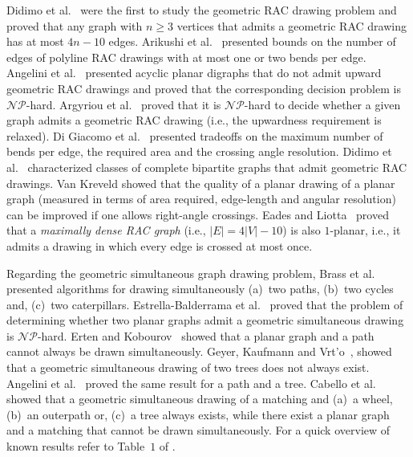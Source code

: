 \documentclass{llncs}
\newcommand{\NP}{\mathcal{NP}}
\begin{document}
Didimo et al.\ \cite{DEL09} were the first to study the geometric
RAC drawing problem and proved that any graph with $n\geq 3$
vertices that admits a geometric RAC drawing has at most $4n-10$
edges. Arikushi et al.\ \cite{AFKMT10} presented bounds on the
number of edges of polyline RAC drawings with at most one or two
bends per edge. Angelini et al.\ \cite{ACBDFKS09} presented acyclic
planar digraphs that do not admit upward geometric RAC drawings and
proved that the corresponding decision problem is $\NP$-hard.
Argyriou et al.\ \cite{ABS11} proved that it is $\NP$-hard to decide
whether a given graph admits a geometric RAC drawing (i.e., the
upwardness requirement is relaxed). Di Giacomo et al.\
\cite{DGDLM10} presented tradeoffs on the maximum number of bends
per edge, the required area and the crossing angle resolution.
Didimo et al.\ \cite{DEL10} characterized classes of complete
bipartite graphs that admit geometric RAC drawings. Van Kreveld
\cite{vK10} showed that the quality of a planar drawing of a planar
graph (measured in terms of area required, edge-length and angular
resolution) can be improved if one allows right-angle crossings.
Eades and Liotta\ \cite{EL11} proved that a \emph{maximally dense
RAC graph} (i.e., $|E|=4|V|-10$) is also $1$-planar, i.e., it admits
a drawing in which every edge is crossed at most once.

Regarding the geometric simultaneous graph drawing problem, Brass et
al.\ \cite{BCDE07} presented algorithms for drawing simultaneously
(a)~two paths, (b)~two cycles and, (c)~two caterpillars.
Estrella-Balderrama et al.\ \cite{EGJPSS07}
proved that the problem of determining whether two planar graphs
admit a geometric simultaneous drawing is $\NP$-hard. Erten and
Kobourov\ \cite{EK05} showed that a planar graph and a path cannot
always be drawn simultaneously.
Geyer,
Kaufmann and Vrt'o\ \cite{GKV09}, showed that a geometric
simultaneous drawing of two trees does not always exist. Angelini et
al.\ \cite{AGKN10} proved the same result for a path and a tree.
Cabello et al.\ \cite{CvKLMSV11} showed that a geometric
simultaneous drawing of a matching and (a)~a wheel, (b)~an outerpath
or, (c)~a tree always exists, while there exist a planar graph and a
matching that cannot be drawn simultaneously. For a quick overview
of known results
refer to Table~$1$ of
\cite{FKK09}.
\end{document}
